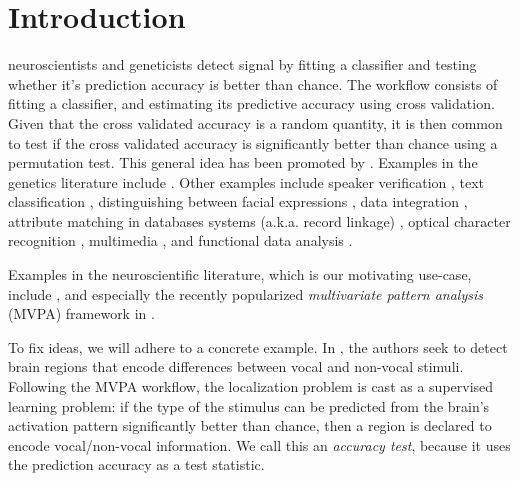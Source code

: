 \documentclass[journal]{IEEEtran}
\begin{document}
%
\IEEEpeerreviewmaketitle



\section{Introduction}
\label{sec:introduction}

 neuroscientists and geneticists detect signal by fitting a classifier and testing whether it's prediction accuracy is better than chance. 
The workflow consists of fitting a classifier, and estimating its predictive accuracy using cross validation.
Given that the cross validated accuracy is a random quantity, it is then common to test if the cross validated accuracy is significantly better than chance using a permutation test.
This general idea has been promoted by \cite{friedman2003multivariate,eric2008testing,lopez2016revisiting}.
Examples in the genetics literature include
\cite{golub_molecular_1999,slonim_class_2000,radmacher_paradigm_2002,mukherjee_estimating_2003,juan_prediction_2004,jiang_calculating_2008,yu2007two}.
Other examples include speaker verification \cite{gretton_kernel_2012-1}, 
text classification \cite{dhillon2003divisive,lopez2016revisiting}, distinguishing between facial expressions \cite{lopez2016revisiting}, data integration \cite{gretton_kernel_2012-1}, attribute matching in databases systems (a.k.a. record linkage) \cite{gretton_kernel_2012-1,hall2002permutation,vayatis_auc_2009}, optical character recognition \cite{perez2009estimation}, multimedia \cite{moreno2004kullback}, and functional data analysis \cite{hall2002permutation}.

Examples in the neuroscientific literature, which is our motivating use-case, include \cite{golland_permutation_2003,pereira_machine_2009,schreiber2013statistical,olivetti2013kernel,varoquaux_assessing_2016}, and especially the recently popularized \emph{multivariate pattern analysis} (MVPA) framework in \cite{kriegeskorte_information-based_2006}.

To fix ideas, we will adhere to a concrete example.
In \cite{gilron_quantifying_2016}, the authors seek to detect brain regions that encode differences between vocal and non-vocal stimuli. 
Following the MVPA workflow, the localization problem is cast as a supervised learning problem: if the type of the stimulus can be predicted from the brain's activation pattern significantly better than chance, then a region is declared to encode vocal/non-vocal information. 
We call this an \emph{accuracy test}, because it uses the prediction accuracy as a test statistic. 
\end{document}
